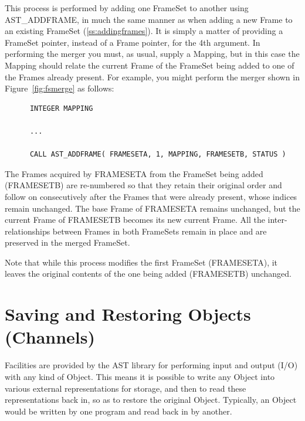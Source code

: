 \documentclass[twoside,11pt]{article}
\newcommand{\htmlref}[2]{#1}
\newcommand{\secref}[1]{\S\ref{#1}}
\renewcommand{\secref}[1]{\ref{#1}}
\begin{document}
This process is performed by adding one FrameSet to another using
AST\_ADDFRAME, in much the same manner as when adding a new Frame to
an existing FrameSet (\secref{ss:addingframes}). It is simply a matter
of providing a FrameSet pointer, instead of a Frame pointer, for the
4th argument. In performing the merger you must, as usual, supply a
Mapping, but in this case the Mapping should relate the current Frame
of the FrameSet being added to one of the Frames already present. For
example, you might perform the merger shown in
Figure~\ref{fig:fsmerge} as follows:

\small
\begin{verbatim}
      INTEGER MAPPING

      ...

      CALL AST_ADDFRAME( FRAMESETA, 1, MAPPING, FRAMESETB, STATUS )
\end{verbatim}
\normalsize

The Frames acquired by FRAMESETA from the FrameSet being added
(FRAMESETB) are re-numbered so that they retain their original order
and follow on consecutively after the Frames that were already
present, whose indices remain unchanged. The base Frame of FRAMESETA
remains unchanged, but the current Frame of FRAMESETB becomes its new
current Frame. All the inter-relationships between Frames in both
FrameSets remain in place and are preserved in the merged FrameSet.

Note that while this process modifies the first FrameSet (FRAMESETA),
it leaves the original contents of the one being added (FRAMESETB)
unchanged.


\cleardoublepage
\section{\label{ss:channels}Saving and Restoring Objects (Channels)}

Facilities are provided by the AST library for performing input and
output (I/O) with any kind of \htmlref{Object}{Object}. This means it is possible
to write any Object into various external representations for
storage, and then to read these representations back in, so as to
restore the original Object. Typically, an Object would be written by
one program and read back in by another.
\end{document}

